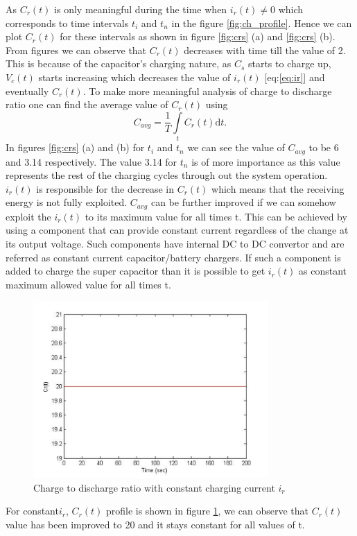 As $C_r(t)$ is only meaningful during the time when $i_r(t) \neq 0$ which corresponds to time intervals $t_i$ and $t_n$ in the figure \ref{fig:ch_profile}. Hence we can plot $C_r(t)$ for these intervals as shown in figure \ref{fig:crs} (a) and \ref{fig:crs} (b). From figures we can observe that $ C_r(t)$ decreases with time till the value of 2. This is because of the capacitor's charging nature, as $C_s$ starts to charge up,$ V_c(t)$ starts increasing which decreases the value of $ i_r(t)$ [eq:\ref{eq:ir}] and eventually $C_r(t)$. 
To make more meaningful analysis of charge to discharge ratio one can find the average value of $C_r(t)$ using
\begin{equation}\label{eq:cravg}
C_{avg} = \frac{1}{T}\int\limits_t C_r(t) \mathrm{d}t.
\end{equation}
In figures \ref{fig:crs} (a) and (b) for $t_i$ and $t_n$ we can see the value of $ C_{avg}$ to be 6 and 3.14 respectively. The value 3.14 for $t_n$ is of more importance as this value represents the rest of the charging cycles through out the system operation. $i_r(t)$ is responsible for the decrease in $C_r(t)$ which means that the receiving energy is not fully exploited. $C_{avg}$ can be further improved if we can somehow exploit the $i_r(t)$ to its maximum value for all times t. This can be achieved by using a component that can provide constant current regardless of the change at its output voltage. Such components have internal DC to DC convertor and are referred as constant current capacitor/battery chargers. If such a component is added to charge the super capacitor than it is possible to get $i_r(t)$ as constant maximum allowed value for all times t.


\begin{figure}[h!]
\centering
\includegraphics[width=0.8\textwidth]{ctd2c.pdf}
\caption{Charge to discharge ratio with constant charging current $i_r$}
\label{fig:crconst}
\end{figure}

 For constant$ i_r$, $C_r(t)$ profile is shown in figure \ref{fig:crconst}, we can observe that $C_r(t)$ value has been improved to 20 and it stays constant for all values of t.
